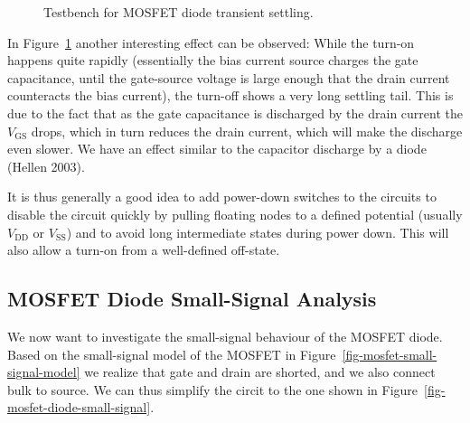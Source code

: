 \documentclass[
  a4paper,
  DIV=11,
  numbers=noendperiod]{scrartcl}
\begin{document}
\begin{figure}


\caption{\label{fig-mosfet-diode-settling-tb}Testbench for MOSFET diode
transient settling.}

\end{figure}%

In Figure~\ref{fig-mosfet-diode-settling-tb} another interesting effect
can be observed: While the turn-on happens quite rapidly (essentially
the bias current source charges the gate capacitance, until the
gate-source voltage is large enough that the drain current counteracts
the bias current), the turn-off shows a very long settling tail. This is
due to the fact that as the gate capacitance is discharged by the drain
current the \(V_\mathrm{GS}\) drops, which in turn reduces the drain
current, which will make the discharge even slower. We have an effect
similar to the capacitor discharge by a diode (Hellen 2003).

It is thus generally a good idea to add power-down switches to the
circuits to disable the circuit quickly by pulling floating nodes to a
defined potential (usually \(V_\mathrm{DD}\) or \(V_\mathrm{SS}\)) and
to avoid long intermediate states during power down. This will also
allow a turn-on from a well-defined off-state.

\subsection{MOSFET Diode Small-Signal
Analysis}\label{mosfet-diode-small-signal-analysis}

We now want to investigate the small-signal behaviour of the MOSFET
diode. Based on the small-signal model of the MOSFET in
Figure~\ref{fig-mosfet-small-signal-model} we realize that gate and
drain are shorted, and we also connect bulk to source. We can thus
simplify the circit to the one shown in
Figure~\ref{fig-mosfet-diode-small-signal}.
\end{document}
